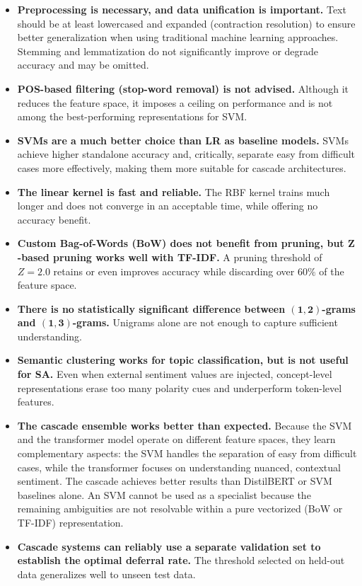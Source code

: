 \documentclass[a4paper,twoside,12pt]{book}
\newcommand{\zscore}{Z}
\newcommand{\logreg}{LR}
\begin{document}
\begin{itemize}
	\item \textbf{Preprocessing is necessary, and data unification is important.} Text should be at least lowercased and expanded (contraction resolution) to ensure better generalization when using traditional machine learning approaches. Stemming and lemmatization do not significantly improve or degrade accuracy and may be omitted.
	
	\item \textbf{POS-based filtering (stop-word removal) is not advised.} Although it reduces the feature space, it imposes a ceiling on performance and is not among the best-performing representations for SVM.
	
	\item \textbf{SVMs are a much better choice than \logreg{} as baseline models.} SVMs achieve higher standalone accuracy and, critically, separate easy from difficult cases more effectively, making them more suitable for cascade architectures. 
	\item \textbf{The linear kernel is fast and reliable.} The RBF kernel trains much longer and does not converge in an acceptable time, while offering no accuracy benefit.
	
	\item \textbf{Custom Bag-of-Words (BoW) does not benefit from pruning, but $\mathbf{\zscore}$-based pruning works well with TF-IDF.} A pruning threshold of $\zscore = 2.0$ retains or even improves accuracy while discarding over $60\%$ of the feature space.
	
	\item \textbf{There is no statistically significant difference between $\mathbf{(1,2)}$-grams and $\mathbf{(1,3)}$-grams.} Unigrams alone are not enough to capture sufficient understanding.
	
	
	\item \textbf{Semantic clustering works for topic classification, but is not useful for SA.} Even when external sentiment values are injected, concept-level representations erase too many polarity cues and underperform token-level features.
	
	\item \textbf{The cascade ensemble works better than expected.} Because the SVM and the transformer model operate on different feature spaces, they learn complementary aspects: the SVM handles the separation of easy from difficult cases, while the transformer focuses on understanding nuanced, contextual sentiment. The cascade achieves better results than DistilBERT or SVM baselines alone. An SVM cannot be used as a specialist because the remaining ambiguities are not resolvable within a pure vectorized (BoW or TF-IDF) representation.
	
	\item \textbf{Cascade systems can reliably use a separate validation set to establish the optimal deferral rate.} The threshold selected on held-out data generalizes well to unseen test data.
\end{itemize}
\end{document}
